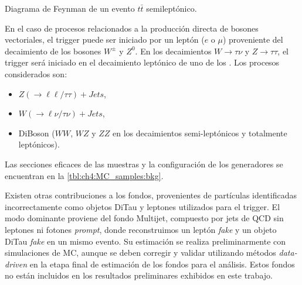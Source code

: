 \begin{marginfigure}[-10em]
    \resizebox{0.99\linewidth}{!}{}
    \caption{Diagrama de Feynman de un evento $t\bar{t}$ semileptónico.}
    \label{fig:ch4:ttbar_diagram}
\end{marginfigure}

En el caso de procesos relacionados a la producción directa de bosones vectoriales, el trigger puede ser iniciado por un leptón ($e$ o $\mu$) proveniente del decaimiento de los bosones $W^\pm$ y $Z^0$. En los decaimientos $W\to\tau\nu$ y $Z\to\tau\tau$, el trigger será iniciado en el decaimiento leptónico de uno de los \ttau. Los procesos considerados son:
\begin{itemize}
    \item $Z(\to \ell\ell / \tau\tau) + Jets$,
    \item $W(\to \ell\nu / \tau\nu) + Jets$,
    \item DiBoson ($WW$, $WZ$ y $ZZ$ en los decaimientos semi-leptónicos y totalmente leptónicos).
\end{itemize}

Las secciones eficaces de las muestras y la configuración de los generadores se encuentran en la \cref{tbl:ch4:MC_samples:bkg}.

Existen otras contribuciones a los fondos, provenientes de partículas identificadas incorrectamente como objetos DiTau y leptones utilizados para el trigger. El modo dominante proviene del fondo Multijet, compuesto por jets de QCD sin leptones ni fotones \textit{prompt}, donde reconstruimos un leptón \textit{fake} y un objeto DiTau \textit{fake} en un mismo evento. Su estimación se realiza preliminarmente con simulaciones de MC, aunque se deben corregir y validar utilizando métodos \textit{data-driven} en la etapa final de estimación de los fondos para el análisis. Estos fondos no están incluidos en los resultados preliminares exhibidos en este trabajo.





 \label{sec:ch4:presel_results}

